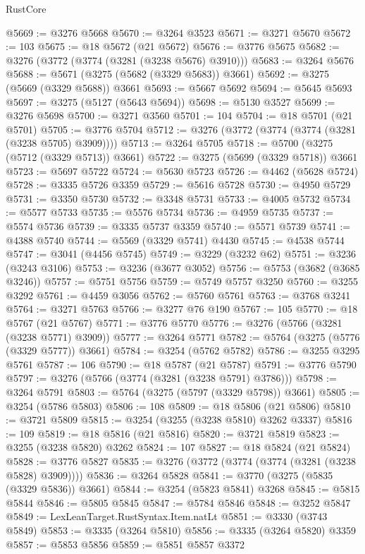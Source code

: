 \begin{lexlean}{RustCore}
\begin{coremodule}
@5669 := @3276 @5668
@5670 := @3264 @3523
@5671 := @3271 @5670
@5672 := 103
@5675 := @18 @5672 (@21 @5672)
@5676 := @3776 @5675
@5682 := @3276 (@3772 (@3774 (@3281 (@3238 @5676) @3910)))
@5683 := @3264 @5676
@5688 := @5671 (@3275 (@5682 (@3329 @5683)) @3661)
@5692 := @3275 (@5669 (@3329 @5688)) @3661
@5693 := @5667 @5692
@5694 := @5645 @5693
@5697 := @3275 (@5127 (@5643 @5694))
@5698 := @5130 @3527
@5699 := @3276 @5698
@5700 := @3271 @3560
@5701 := 104
@5704 := @18 @5701 (@21 @5701)
@5705 := @3776 @5704
@5712 := @3276 (@3772 (@3774 (@3774 (@3281 (@3238 @5705) @3909))))
@5713 := @3264 @5705
@5718 := @5700 (@3275 (@5712 (@3329 @5713)) @3661)
@5722 := @3275 (@5699 (@3329 @5718)) @3661
@5723 := @5697 @5722
@5724 := @5630 @5723
@5726 := @4462 (@5628 @5724)
@5728 := @3335 @5726 @3359
@5729 := @5616 @5728
@5730 := @4950 @5729
@5731 := @3350 @5730
@5732 := @3348 @5731
@5733 := @4005 @5732
@5734 := @5577 @5733
@5735 := @5576 @5734
@5736 := @4959 @5735
@5737 := @5574 @5736
@5739 := @3335 @5737 @3359
@5740 := @5571 @5739
@5741 := @4388 @5740
@5744 := @5569 (@3329 @5741) @4430
@5745 := @4538 @5744
@5747 := @3041 (@4456 @5745)
@5749 := @3229 (@3232 @62)
@5751 := @3236 (@3243 @3106)
@5753 := @3236 (@3677 @3052)
@5756 := @5753 (@3682 (@3685 @3246))
@5757 := @5751 @5756
@5759 := @5749 @5757 @3250
@5760 := @3255 @3292
@5761 := @4459 @3056
@5762 := @5760 @5761
@5763 := @3768 @3241
@5764 := @3271 @5763
@5766 := @3277 @76 @190
@5767 := 105
@5770 := @18 @5767 (@21 @5767)
@5771 := @3776 @5770
@5776 := @3276 (@5766 (@3281 (@3238 @5771) @3909))
@5777 := @3264 @5771
@5782 := @5764 (@3275 (@5776 (@3329 @5777)) @3661)
@5784 := @3254 (@5762 @5782)
@5786 := @3255 @3295 @5761
@5787 := 106
@5790 := @18 @5787 (@21 @5787)
@5791 := @3776 @5790
@5797 := @3276 (@5766 (@3774 (@3281 (@3238 @5791) @3786)))
@5798 := @3264 @5791
@5803 := @5764 (@3275 (@5797 (@3329 @5798)) @3661)
@5805 := @3254 (@5786 @5803)
@5806 := 108
@5809 := @18 @5806 (@21 @5806)
@5810 := @3721 @5809
@5815 := @3254 (@3255 (@3238 @5810) @3262 @3337)
@5816 := 109
@5819 := @18 @5816 (@21 @5816)
@5820 := @3721 @5819
@5823 := @3255 (@3238 @5820) @3262
@5824 := 107
@5827 := @18 @5824 (@21 @5824)
@5828 := @3776 @5827
@5835 := @3276 (@3772 (@3774 (@3774 (@3281 (@3238 @5828) @3909))))
@5836 := @3264 @5828
@5841 := @3770 (@3275 (@5835 (@3329 @5836)) @3661)
@5844 := @3254 (@5823 @5841) @3268
@5845 := @5815 @5844
@5846 := @5805 @5845
@5847 := @5784 @5846
@5848 := @3252 @5847
@5849 := LexLeanTarget.RustSyntax.Item.natLt
@5851 := @3330 (@3743 @5849)
@5853 := @3335 (@3264 @5810)
@5856 := @3335 (@3264 @5820) @3359
@5857 := @5853 @5856
@5859 := @5851 @5857 @3372

\end{coremodule}
\end{lexlean}

